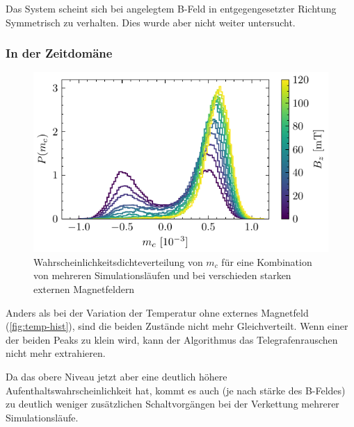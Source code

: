 \documentclass[main.tex]{subfiles}
\begin{document}
Das System scheint sich bei angelegtem B-Feld in entgegengesetzter Richtung Symmetrisch zu verhalten. Dies wurde aber nicht weiter untersucht.


\subsubsection{In der Zeitdomäne}

\begin{figure}[H]
    \centering
    \includegraphics{bilder/plots/max_Bz/mc_hist.pdf}
    \caption{Wahrscheinlichkeitsdichteverteilung von \(m_c\) für eine Kombination von mehreren Simulationsläufen und bei verschieden starken externen Magnetfeldern}\label{fig:b-hist}    
\end{figure}

Anders als bei der Variation der Temperatur ohne externes Magnetfeld (\cref{fig:temp-hist}), sind die beiden Zustände nicht mehr Gleichverteilt. Wenn einer der beiden Peaks zu klein wird, kann der Algorithmus das Telegrafenrauschen nicht mehr extrahieren. 

Da das obere Niveau jetzt aber eine deutlich höhere Aufenthaltswahrscheinlichkeit hat, kommt es auch (je nach stärke des B-Feldes) zu deutlich weniger zusätzlichen Schaltvorgängen bei der Verkettung mehrerer Simulationsläufe.


\end{document}
